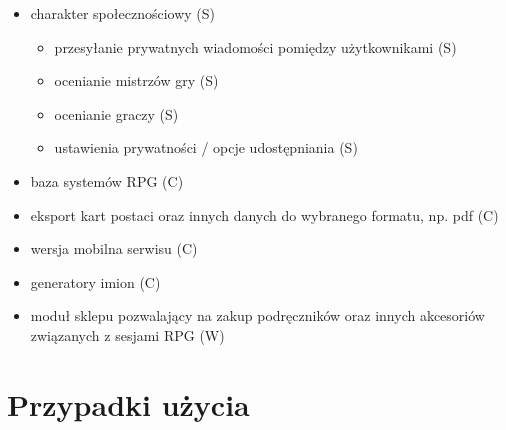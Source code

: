 \begin{itemize}
\item charakter społecznościowy (S)
	\begin{itemize}
	\item przesyłanie prywatnych wiadomości pomiędzy użytkownikami (S)
	\item ocenianie mistrzów gry (S)
	\item ocenianie graczy (S)
	\item ustawienia prywatności / opcje udostępniania (S)
	\end{itemize}
\item baza systemów RPG (C)
\item eksport kart postaci oraz innych danych do wybranego formatu, np. pdf (C)
\item wersja mobilna serwisu (C)
\item generatory imion (C)
\item moduł sklepu pozwalający na zakup podręczników oraz innych akcesoriów związanych z sesjami RPG (W)
\end{itemize}


\section{Przypadki użycia}
\label{sec:przypadki}

\renewcommand{\labelenumi}{\arabic{enumi}.} 
\renewcommand{\labelenumii}{\arabic{enumi}.\arabic{enumii}.}
\renewcommand{\labelenumiii}{\arabic{enumi}.\arabic{enumii}.\arabic{enumiii}.}

